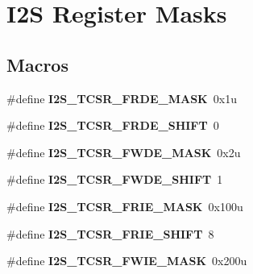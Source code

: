 \hypertarget{group__I2S__Register__Masks}{}\section{I2S Register Masks}
\label{group__I2S__Register__Masks}
\subsection*{Macros}
\begin{DoxyCompactItemize}
\item 
\#define {\bfseries I2\+S\+\_\+\+T\+C\+S\+R\+\_\+\+F\+R\+D\+E\+\_\+\+M\+A\+SK}~0x1u\hypertarget{group__I2S__Register__Masks_gae565812ade16ef43b2c8de0da9434dc7}{}\label{group__I2S__Register__Masks_gae565812ade16ef43b2c8de0da9434dc7}

\item 
\#define {\bfseries I2\+S\+\_\+\+T\+C\+S\+R\+\_\+\+F\+R\+D\+E\+\_\+\+S\+H\+I\+FT}~0\hypertarget{group__I2S__Register__Masks_ga625ff0e116f205afc5810d46b33889e8}{}\label{group__I2S__Register__Masks_ga625ff0e116f205afc5810d46b33889e8}

\item 
\#define {\bfseries I2\+S\+\_\+\+T\+C\+S\+R\+\_\+\+F\+W\+D\+E\+\_\+\+M\+A\+SK}~0x2u\hypertarget{group__I2S__Register__Masks_ga1ee38c9bb8913b7ad39101588a3b6f81}{}\label{group__I2S__Register__Masks_ga1ee38c9bb8913b7ad39101588a3b6f81}

\item 
\#define {\bfseries I2\+S\+\_\+\+T\+C\+S\+R\+\_\+\+F\+W\+D\+E\+\_\+\+S\+H\+I\+FT}~1\hypertarget{group__I2S__Register__Masks_ga711259f1f84d00f66491a4369794c9be}{}\label{group__I2S__Register__Masks_ga711259f1f84d00f66491a4369794c9be}

\item 
\#define {\bfseries I2\+S\+\_\+\+T\+C\+S\+R\+\_\+\+F\+R\+I\+E\+\_\+\+M\+A\+SK}~0x100u\hypertarget{group__I2S__Register__Masks_gaa4df5fe488cb4d2acb0bfd546f660507}{}\label{group__I2S__Register__Masks_gaa4df5fe488cb4d2acb0bfd546f660507}

\item 
\#define {\bfseries I2\+S\+\_\+\+T\+C\+S\+R\+\_\+\+F\+R\+I\+E\+\_\+\+S\+H\+I\+FT}~8\hypertarget{group__I2S__Register__Masks_gae80718274a142dbe1c9b84baddb880fe}{}\label{group__I2S__Register__Masks_gae80718274a142dbe1c9b84baddb880fe}

\item 
\#define {\bfseries I2\+S\+\_\+\+T\+C\+S\+R\+\_\+\+F\+W\+I\+E\+\_\+\+M\+A\+SK}~0x200u\hypertarget{group__I2S__Register__Masks_ga4cd03b204167fc3671c12fa3462d38fb}{}\label{group__I2S__Register__Masks_ga4cd03b204167fc3671c12fa3462d38fb}


\end{DoxyCompactItemize}
